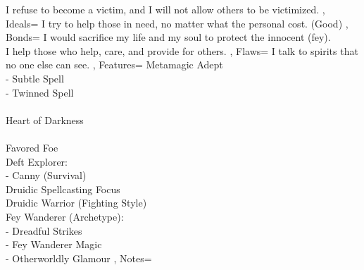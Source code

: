 \documentclass[10pt,a4paper]{scrbook}
\begin{document}
{{			I refuse to become a victim, and I will not allow others to be victimized.
		},
		Ideals={
			I try to help those in need, no matter what the personal cost. (Good)
		},
		Bonds={
			\tiny
			I would sacrifice my life and my soul to protect the innocent (fey).\\
			I help those who help, care, and provide for others.
		},
		Flaws={
			I talk to spirits that no one else can see.
		},
		Features={
			Metamagic Adept\\
			- Subtle Spell\\
			- Twinned Spell\\
			\\
			Heart of Darkness\\
			\\
			Favored Foe\\ %
			Deft Explorer:\\ %
			- Canny (Survival)\\
			Druidic Spellcasting Focus\\
			Druidic Warrior (Fighting Style)\\
			Fey Wanderer (Archetype):\\
			- Dreadful Strikes\\
			- Fey Wanderer Magic\\
			- Otherworldly Glamour
		},
		Notes={
		}
	}
\end{document}
